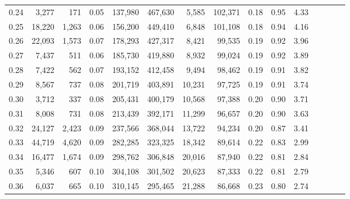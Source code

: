 \begin{tabular}{rrrcrrrrrrrrrrr}
0.24 &   3,277 &    171 &                                       0.05 &  137,980 &  467,630 &    5,585 &  102,371 &  0.18 &  0.95 &                         4.33 \\
0.25 &  18,220 &  1,263 &                                       0.06 &  156,200 &  449,410 &    6,848 &  101,108 &  0.18 &  0.94 &                         4.16 \\
0.26 &  22,093 &  1,573 &                                       0.07 &  178,293 &  427,317 &    8,421 &   99,535 &  0.19 &  0.92 &                         3.96 \\
0.27 &   7,437 &    511 &                                       0.06 &  185,730 &  419,880 &    8,932 &   99,024 &  0.19 &  0.92 &                         3.89 \\
0.28 &   7,422 &    562 &                                       0.07 &  193,152 &  412,458 &    9,494 &   98,462 &  0.19 &  0.91 &                         3.82 \\
0.29 &   8,567 &    737 &                                       0.08 &  201,719 &  403,891 &   10,231 &   97,725 &  0.19 &  0.91 &                         3.74 \\
0.30 &   3,712 &    337 &                                       0.08 &  205,431 &  400,179 &   10,568 &   97,388 &  0.20 &  0.90 &                         3.71 \\
0.31 &   8,008 &    731 &                                       0.08 &  213,439 &  392,171 &   11,299 &   96,657 &  0.20 &  0.90 &                         3.63 \\
0.32 &  24,127 &  2,423 &                                       0.09 &  237,566 &  368,044 &   13,722 &   94,234 &  0.20 &  0.87 &                         3.41 \\
0.33 &  44,719 &  4,620 &                                       0.09 &  282,285 &  323,325 &   18,342 &   89,614 &  0.22 &  0.83 &                         2.99 \\
0.34 &  16,477 &  1,674 &                                       0.09 &  298,762 &  306,848 &   20,016 &   87,940 &  0.22 &  0.81 &                         2.84 \\
0.35 &   5,346 &    607 &                                       0.10 &  304,108 &  301,502 &   20,623 &   87,333 &  0.22 &  0.81 &                         2.79 \\
0.36 &   6,037 &    665 &                                       0.10 &  310,145 &  295,465 &   21,288 &   86,668 &  0.23 &  0.80 &                         2.74 \\

\end{tabular}
